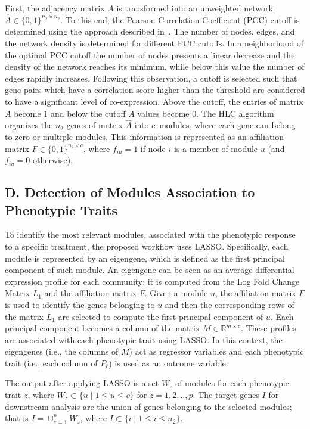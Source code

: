 First, the adjacency matrix $A$ is transformed into an unweighted
network $\hat{A} \in \{0,1\}^{n_2 \times n_2}$.
To this end, the Pearson Correlation Coefficient
(PCC) cutoff is determined using the approach described
in~\cite{aoki2007approaches}. The number of nodes, edges, and the
network density is determined for different PCC cutoffs. 
In a neighborhood of the optimal PCC cutoff
the number of nodes presents a linear
decrease and the density of the network reaches its minimum, while
below this value the number of edges rapidly increases. Following this
observation, a cutoff is selected such that gene pairs which have a
correlation score higher than the threshold are considered to have
a significant level of co-expression. Above the cutoff, the entries of
matrix $A$ become $1$ and below the cutoff $A$ values become $0$. The
HLC algorithm organizes the $n_2$ genes of matrix $\hat{A}$ into $c$~modules, where each gene can belong to zero or multiple modules.
This information is represented as an affiliation matrix $F \in
\{0,1\}^{n_2 \times c}$, where $f_{iu} = 1$ if node $i$ is a member of
module $u$ (and $f_{iu}=0$ otherwise).

\subsection*{D. Detection of Modules Association to Phenotypic Traits}

To identify the most relevant modules, associated
with the phenotypic response to a specific treatment,
the proposed workflow uses LASSO. Specifically, each module is
represented by an eigengene, which is defined as the first principal
component of such module. An eigengene can be seen as an average
differential expression profile for each community: it is computed
from the Log Fold Change Matrix $L_1$ and the affiliation matrix
$F$. Given a module $u$, the affiliation matrix $F$ is used to identify
the genes belonging to $u$ and then the corresponding rows of the
matrix $L_1$ are selected to compute the first principal component of
$u$. Each principal component becomes a column of the matrix $M \in
\mathbb{R}^{m \times c}$.  These profiles are associated with each
phenotypic trait using
LASSO.  In this context, the eigengenes (i.e., the columns
of $M$) act as regressor variables and each phenotypic trait (i.e.,
each column of $P_\ell$) is used as an outcome variable.
\vspace{0.5cm}

The output after applying LASSO is a set $W_z$ of modules for each
phenotypic trait $z$, where $W_z \subset \{u \mid 1 \leq u \leq c\}$
for $z= 1,2,..,p$. The target genes $I$ for downstream analysis
are the union of genes
belonging to the selected modules; that is $I = \cup_{z=1}^{p} W_z$,
where $I \subset \{i \mid 1 \leq i \leq n_2\}$.

